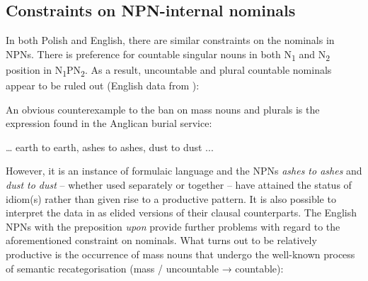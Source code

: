 \documentclass[output=paper]{langscibook}
\begin{document}
\subsection{Constraints on NPN-internal nominals}\label{psk:sec:constraints}

In both Polish and English, there are similar constraints on the nominals in NPNs. There is preference for countable singular nouns in  both N\textsubscript{1} and N\textsubscript{2} position in N\textsubscript{1}PN\textsubscript{2}. As a result, uncountable  and plural countable nominals  appear to be ruled out (English data from \citealt{Jackendoff2008}):

\ea \label{psk:ex:2}  \label{psk:ex:key:2a}
\z\ex \label{psk:ex:key:3}  \label{psk:ex:key:3a}
\z
\z

\noindent An obvious counterexample to the ban on mass nouns  and plurals  is the expression found in the Anglican burial service:

\ea \label{psk:ex:key:4}  … earth to earth, ashes to ashes, dust to dust ...\\
\z

\noindent However, it is an instance of formulaic language and the NPNs \textit{ashes to ashes} and \textit{dust to dust} – whether used separately or together – have attained the status of idiom(s) rather than given rise to a productive pattern. It is also possible to interpret the data in  as elided versions of their clausal counterparts. The English NPNs with the preposition \textit{upon} provide further problems with regard to the aforementioned constraint on nominals. What turns out to be relatively productive is the occurrence of mass nouns that undergo the well-known process of semantic recategorisation (mass / uncountable → countable):
\end{document}
